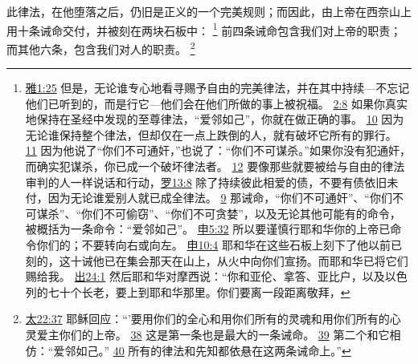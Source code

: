 \documentclass[12pt, a4paper, oneside]{ctexart}
\newcounter{parnum}[section]
\newcommand{\N}{%
   \noindent\refstepcounter{parnum}%
    \makebox[\parindent][l]{\textbf{\arabic{parnum}.}}}
\begin{document}
\N 此律法，在他堕落之后，仍旧是正义的一个完美规则；而因此，由上帝在西奈山上用十条诫命交付，并被刻在两块石板中：
	\footnote {
		\href{https://biblehub.com/james/1-25.htm}{雅1:25} 但是，无论谁专心地看寻赐予自由的完美律法，并在其中持续---不忘记他们已听到的，而是行它---他们会在他们所做的事上被祝福。
		\href{https://biblehub.com/james/2-8.htm}{2:8} 如果你真实地保持在圣经中发现的至尊律法，“爱邻如己”，你就在做正确的事。
		\href{https://biblehub.com/james/2-10.htm}{10} 因为无论谁保持整个律法，但却仅在一点上跌倒的人，就有破坏它所有的罪行。
		\href{https://biblehub.com/james/2-11.htm}{11} 因为他说了“你们不可通奸，”也说了：“你们不可谋杀。”如果你没有犯通奸，而确实犯谋杀，你已成一个破坏律法者。
		\href{https://biblehub.com/james/2-12.htm}{12} 要像那些就要被给与自由的律法审判的人一样说话和行动，\href{https://biblehub.com/romans/13-8.htm}{罗13:8} 除了持续彼此相爱的债，不要有债依旧未付，因为无论谁爱别人就已成全律法。
		\href{https://biblehub.com/romans/13-9.htm}{9} 那诫命，“你们不可通奸”、“你们不可谋杀”、“你们不可偷窃”、“你们不可贪婪”，以及无论其他可能有的命令，被概括为一条命令：“爱邻如己”。
		\href{https://biblehub.com/deuteronomy/5-32.htm}{申5:32} 所以要谨慎行耶和华你的上帝已命令你们的；不要转向右或向左。
		\href{https://biblehub.com/deuteronomy/10-4.htm}{申10:4} 耶和华在这些石板上刻下了他以前已刻的，这十诫他已在集会那天在山上，从火中向你们宣扬。而耶和华已将它们赐给我。
		\href{https://biblehub.com/exodus/24-1.htm}{出24:1} 然后耶和华对摩西说：“你和亚伦、拿答、亚比户，以及以色列的七十个长老，要上到耶和华那里。你们要离一段距离敬拜，
	}
	前四条诫命包含我们对上帝的职责；而其他六条，包含我们对人的职责。
	\footnote {
		\href{https://biblehub.com/matthew/22-37.htm}{太22:37} 耶稣回应：“'要用你们的全心和用你们所有的灵魂和用你们所有的心灵爱主你们的上帝。
		\href{https://biblehub.com/matthew/22-38.htm}{38} 这是第一条也是最大的一条诫命。
		\href{https://biblehub.com/matthew/22-39.htm}{39} 第二个和它相仿：“爱邻如己。”
		\href{https://biblehub.com/matthew/22-40.htm}{40} 所有的律法和先知都依悬在这两条诫命上。”
	}
\end{document}
